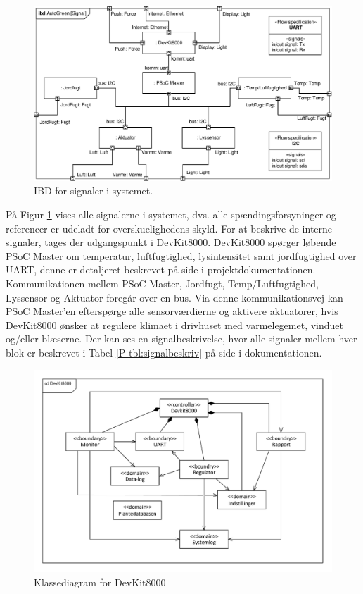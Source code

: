 \clearpage

\begin{figure}[h]
\centering 
\includegraphics[scale=0.97, angle = 90] {../fig/ibd_system_signaler.pdf}
\caption{IBD for signaler i systemet.}
\label{fig:ibd_system_signal}
\end{figure}

På Figur \ref{fig:ibd_system_signal} vises alle signalerne i systemet, dvs. alle spændingsforsyninger og referencer er udeladt for overskuelighedens skyld. For at beskrive de interne signaler, tages der udgangspunkt i DevKit8000. DevKit8000 spørger løbende PSoC Master om temperatur, luftfugtighed, lysintensitet samt jordfugtighed over UART, denne er detaljeret beskrevet på side \pageref{P-sec:UART_protokol} i projektdokumentationen. Kommunikationen mellem PSoC Master, Jordfugt, Temp/Luftfugtighed, Lyssensor og Aktuator foregår over en \IIC bus. Via denne kommunikationsvej kan PSoC Master'en efterspørge alle sensorværdierne og aktivere aktuatorer, hvis DevKit8000 ønsker at regulere klimaet i drivhuset med varmelegemet, vinduet og/eller blæserne. Der kan ses en signalbeskrivelse, hvor alle signaler mellem hver blok er beskrevet i Tabel \ref{P-tbl:signalbeskriv} på side \pageref{P-tbl:signalbeskriv} i dokumentationen.

\clearpage

\begin{figure}[h]
\centering 
\includegraphics[scale=0.8] {../fig/UML_autogreen.pdf}
\caption{Klassediagram for DevKit8000}
\label{fig:UML}
\end{figure}

